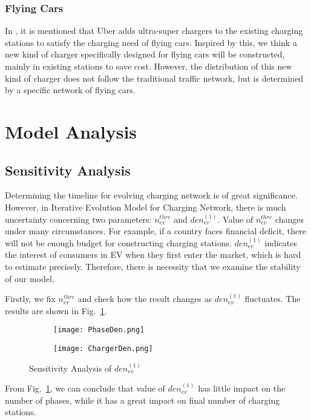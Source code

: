 \documentclass{mcmthesis}
\begin{document}
\subsubsection*{Flying Cars}
In \cite{FlyingCar}, it is mentioned that Uber adds ultra-super chargers to the existing charging stations to satisfy the charging need of flying cars. Inspired by this, we think a new kind of charger specifically designed for flying cars will be constructed, mainly in existing stations to save cost. However, the distribution of this new kind of charger does not follow the traditional traffic network, but is determined by a specific network of flying cars.
\section{Model Analysis}\label{Sec-Analysis}
\subsection{Sensitivity Analysis}
Determining the timeline for evolving charging network is of great significance. However, in Iterative Evolution Model for Charging Network, there is much uncertainty concerning two parameters: $n_{ev}^{thre}$ and $den_{ev}^{(1)}$. Value of $n_{ev}^{thre}$ changes under many circumstances. For example, if a country faces financial deficit, there will not be enough budget for constructing charging stations. $den_{ev}^{(1)}$ indicates the interest of consumers in EV when they first enter the market, which is hard to estimate precisely. Therefore, there is necessity that we examine the stability of our model.

Firstly, we fix $n_{ev}^{thre}$ and check how the result changes as $den_{ev}^{(1)}$ fluctuates. The results are shown in Fig.~\ref{Fig-SenDen}.

\begin{figure}[htbp]
    \centering
    \begin{subfigure}[b]{0.45\textwidth}
		\texttt{[image: PhaseDen.png]}
	\end{subfigure}
    \begin{subfigure}[b]{0.45\textwidth}
		\texttt{[image: ChargerDen.png]}
	\end{subfigure}
    \caption{Sensitivity Analysis of $den_{ev}^{(1)}$}\label{Fig-SenDen}
\end{figure}
From Fig.~\ref{Fig-SenDen}, we can conclude that value of $den_{ev}^{(1)}$ has little impact on the number of phases, while it has a great impact on final number of charging stations.
\end{document}
